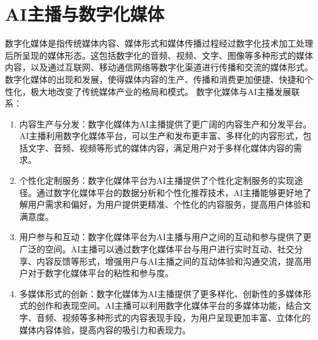\documentclass[11pt, a4paper, oneside]{ctexbook}
\begin{document}
\section{AI主播与数字化媒体}
数字化媒体是指传统媒体内容、媒体形式和媒体传播过程经过数字化技术加工处理后所呈现的媒体形态。这包括数字化的音频、视频、文字、图像等多种形式的媒体内容，以及通过互联网、移动通信网络等数字化渠道进行传播和交流的媒体形式。数字化媒体的出现和发展，使得媒体内容的生产、传播和消费更加便捷、快捷和个性化，极大地改变了传统媒体产业的格局和模式。
数字化媒体与AI主播发展联系：
\begin{enumerate}
    \item 内容生产与分发：数字化媒体为AI主播提供了更广阔的内容生产和分发平台。AI主播利用数字化媒体平台，可以生产和发布更丰富、多样化的内容形式，包括文字、音频、视频等形式的媒体内容，满足用户对于多样化媒体内容的需求。
    \item 个性化定制服务：数字化媒体平台为AI主播提供了个性化定制服务的实现途径。通过数字化媒体平台的数据分析和个性化推荐技术，AI主播能够更好地了解用户需求和偏好，为用户提供更精准、个性化的内容服务，提高用户体验和满意度。
    \item 用户参与和互动：数字化媒体平台为AI主播与用户之间的互动和参与提供了更广泛的空间。AI主播可以通过数字化媒体平台与用户进行实时互动、社交分享、内容反馈等形式，增强用户与AI主播之间的互动体验和沟通交流，提高用户对于数字化媒体平台的粘性和参与度。
    \item 多媒体形式的创新：数字化媒体为AI主播提供了更多样化、创新性的多媒体形式的创作和表现空间。AI主播可以利用数字化媒体平台的多媒体功能，结合文字、音频、视频等多种形式的内容表现手段，为用户呈现更加丰富、立体化的媒体内容体验，提高内容的吸引力和表现力。
\end{enumerate}
\end{document}
